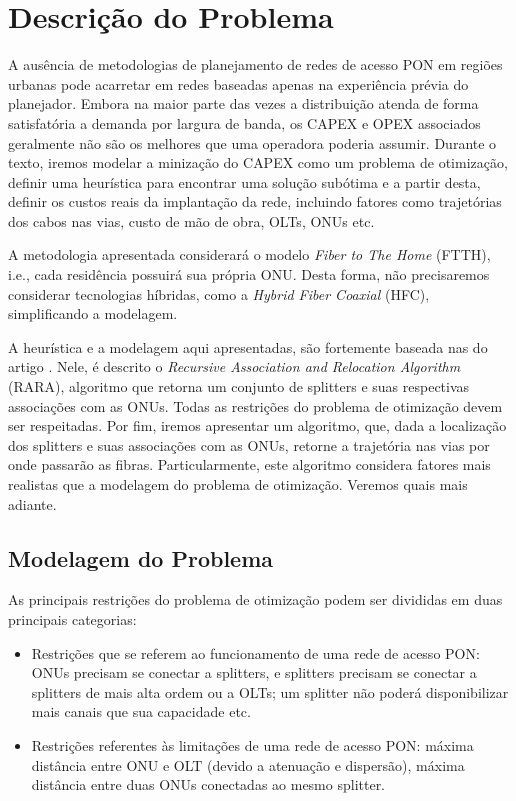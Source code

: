 \documentclass[12pt]{article}
\begin{document}
\section{Descrição do Problema}
A ausência de metodologias de planejamento de redes de acesso PON em regiões urbanas pode acarretar em redes baseadas apenas na experiência prévia do planejador. Embora  na maior parte das vezes a distribuição atenda de forma satisfatória a demanda por largura de banda, os CAPEX e OPEX associados geralmente não são os melhores que uma operadora poderia assumir. Durante o texto, iremos modelar a minização do CAPEX como um problema de otimização, definir uma heurística para encontrar uma solução subótima e a partir desta, definir os custos reais da implantação da rede, incluindo fatores como trajetórias dos cabos nas vias, custo de mão de obra, OLTs, ONUs etc.

A metodologia apresentada considerará o modelo \textit{Fiber to The Home} (FTTH), i.e., cada residência possuirá sua própria ONU. Desta forma, não precisaremos considerar  tecnologias híbridas, como a \textit{Hybrid Fiber Coaxial} (HFC), simplificando a modelagem.

A heurística e a modelagem aqui apresentadas, são fortemente baseada nas do artigo \cite{optpon}. Nele, é descrito o \textit{Recursive Association and Relocation Algorithm} (RARA), algoritmo que retorna um conjunto de splitters e suas respectivas associações com as ONUs. Todas as restrições do problema de otimização devem ser respeitadas. Por fim, iremos apresentar um algoritmo, que, dada a localização dos splitters e suas associações com as ONUs, retorne a trajetória nas vias por onde passarão as fibras. Particularmente, este algoritmo considera fatores mais realistas que a modelagem do problema de otimização. Veremos quais mais adiante.

\subsection{Modelagem do Problema}
As principais restrições do problema de otimização podem ser divididas em duas principais categorias:
\begin{itemize}
\item Restrições que se referem ao funcionamento de uma rede de acesso PON: ONUs precisam se conectar a splitters, e splitters precisam se conectar a splitters de mais alta ordem ou a OLTs; um splitter não poderá disponibilizar mais canais que sua capacidade etc.
\item Restrições referentes às limitações de uma rede de acesso PON: máxima distância entre ONU e OLT (devido a atenuação e dispersão), máxima distância entre duas ONUs conectadas ao mesmo splitter.
\end{itemize}
\end{document}
